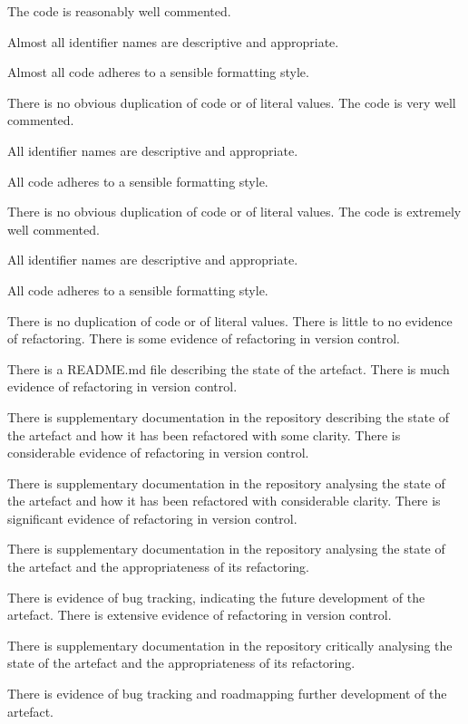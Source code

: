 \begin{markingrubric}
        \grade The code is reasonably well commented.
            \par Almost all identifier names are descriptive and appropriate.
            \par Almost all code adheres to a sensible formatting style.
             \par There is no obvious duplication of code or of literal values.
        \grade The code is very well commented.
            \par All identifier names are descriptive and appropriate.
            \par All code adheres to a sensible formatting style.
             \par There is no obvious duplication of code or of literal values.
        \grade The code is extremely well commented.
            \par All identifier names are descriptive and appropriate.
            \par All code adheres to a sensible formatting style.
            \par There is no duplication of code or of literal values.
%
        \grade \fail There is little to no evidence of refactoring. 
        \grade There is some evidence of refactoring in version control. 
            \par There is a README.md file describing the state of the artefact.  
        \grade There is much evidence of refactoring in version control.
            \par There is supplementary documentation in the repository describing the state of the artefact and how it has been refactored with some clarity.  
        \grade There is considerable evidence of refactoring in version control.  
            \par There is supplementary documentation in the repository analysing the state of the artefact and how it has been refactored with considerable clarity.  
        \grade There is significant evidence of refactoring in version control.  
            \par There is supplementary documentation in the repository analysing the state of the artefact and the appropriateness of its refactoring.  
            \par There is evidence of bug tracking, indicating the future development of the artefact.  
        \grade There is extensive evidence of refactoring in version control. 
            \par There is supplementary documentation in the repository critically analysing the state of the artefact and the appropriateness of its refactoring.  
            \par There is evidence of bug tracking and roadmapping further development of the artefact.  
%
\end{markingrubric}

